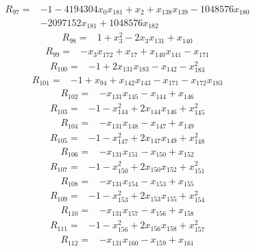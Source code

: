 \begin{align*} R_{97}={}&-1 -4194304 x_{0}x_{181} +x_{2} +x_{138}x_{139} -1048576 x_{180}
\\ &-2097152 x_{181} +1048576 x_{182}
\end{align*}
\begin{align*} R_{98}={}&1 +x_{3}^{2} -2 x_{3}x_{131} +x_{140}
\end{align*}
\begin{align*} R_{99}={}&-x_{3}x_{172} +x_{17} +x_{140}x_{141} -x_{171}
\end{align*}
\begin{align*} R_{100}={}&-1 +2 x_{131}x_{183} -x_{142} -x_{183}^{2}
\end{align*}
\begin{align*} R_{101}={}&-1 +x_{94} +x_{142}x_{143} -x_{171} -x_{172}x_{183}
\end{align*}
\begin{align*} R_{102}={}&-x_{131}x_{145} -x_{144} +x_{146}
\end{align*}
\begin{align*} R_{103}={}&-1 -x_{144}^{2} +2 x_{144}x_{146} +x_{145}^{2}
\end{align*}
\begin{align*} R_{104}={}&-x_{131}x_{148} -x_{147} +x_{149}
\end{align*}
\begin{align*} R_{105}={}&-1 -x_{147}^{2} +2 x_{147}x_{149} +x_{148}^{2}
\end{align*}
\begin{align*} R_{106}={}&-x_{131}x_{151} -x_{150} +x_{152}
\end{align*}
\begin{align*} R_{107}={}&-1 -x_{150}^{2} +2 x_{150}x_{152} +x_{151}^{2}
\end{align*}
\begin{align*} R_{108}={}&-x_{131}x_{154} -x_{153} +x_{155}
\end{align*}
\begin{align*} R_{109}={}&-1 -x_{153}^{2} +2 x_{153}x_{155} +x_{154}^{2}
\end{align*}
\begin{align*} R_{110}={}&-x_{131}x_{157} -x_{156} +x_{158}
\end{align*}
\begin{align*} R_{111}={}&-1 -x_{156}^{2} +2 x_{156}x_{158} +x_{157}^{2}
\end{align*}
\begin{align*} R_{112}={}&-x_{131}x_{160} -x_{159} +x_{161}
\end{align*}
